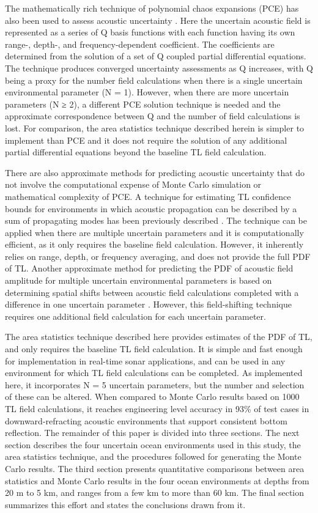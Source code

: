 The mathematically rich technique of polynomial chaos expansions (PCE)
has also been used to assess acoustic uncertainty
\citep{Finette2005,Finette2006,Finette2009}. Here the uncertain
acoustic field is represented as a series of Q basis functions with
each function having its own range-, depth-, and frequency-dependent
coefficient. The coefficients are determined from the solution of a
set of Q coupled partial differential equations. The technique
produces converged uncertainty assessments as Q increases, with Q
being a proxy for the number field calculations when there is a single
uncertain environmental parameter (N = 1). However, when there are
more uncertain parameters (N ≥ 2), a different PCE solution technique
is needed and the approximate correspondence between Q and the number
of field calculations is lost. For comparison, the area statistics
technique described herein is simpler to implement than PCE and it
does not require the solution of any additional partial differential
equations beyond the baseline TL field calculation.

There are also approximate methods for predicting acoustic uncertainty
that do not involve the computational expense of Monte Carlo
simulation or mathematical complexity of PCE. A technique for
estimating TL confidence bounds for environments in which acoustic
propagation can be described by a sum of propagating modes has been
previously described \citep{Zingarelli2008}. The technique can be
applied when there are multiple uncertain parameters and it is
computationally efficient, as it only requires the baseline field
calculation. However, it inherently relies on range, depth, or
frequency averaging, and does not provide the full PDF of TL. Another
approximate method for predicting the PDF of acoustic field amplitude
for multiple uncertain environmental parameters is based on
determining spatial shifts between acoustic field calculations
completed with a difference in one uncertain parameter
\citep{James2008}. However, this field-shifting technique requires one
additional field calculation for each uncertain parameter.

The area statistics technique described here provides estimates of the
PDF of TL, and only requires the baseline TL field calculation. It is
simple and fast enough for implementation in real-time sonar
applications, and can be used in any environment for which TL field
calculations can be completed. As implemented here, it incorporates N
= 5 uncertain parameters, but the number and selection of these can be
altered. When compared to Monte Carlo results based on 1000 TL field
calculations, it reaches engineering level accuracy in 93\% of test
cases in downward-refracting acoustic environments that support
consistent bottom reflection.  The remainder of this paper is divided
into three sections. The next section describes the four uncertain
ocean environments used in this study, the area statistics technique,
and the procedures followed for generating the Monte Carlo
results. The third section presents quantitative comparisons between
area statistics and Monte Carlo results in the four ocean environments
at depths from 20 m to 5 km, and ranges from a few km to more than 60
km. The final section summarizes this effort and states the
conclusions drawn from it.

